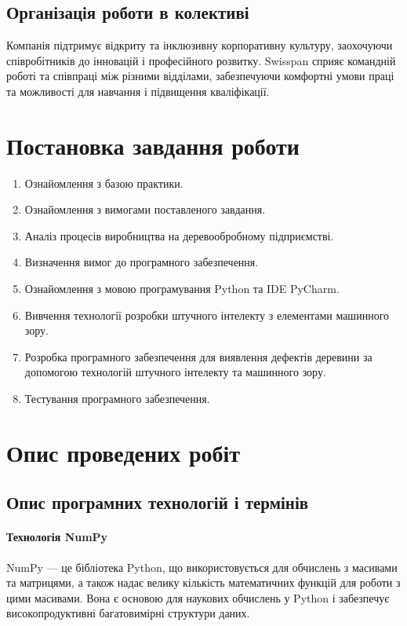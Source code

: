 \documentclass[oneside,14pt]{extarticle}
\begin{document}
\subsection{Організація роботи в колективі}

Компанія підтримує відкриту та інклюзивну корпоративну культуру, заохочуючи співробітників до інновацій і професійного розвитку. Swisspan сприяє командній роботі та співпраці між різними відділами, забезпечуючи комфортні умови праці та можливості для навчання і підвищення кваліфікації.

\section{Постановка завдання роботи}
\begin{enumerate}
	\item Ознайомлення з базою практики.
	\item Ознайомлення з вимогами поставленого завдання.
	\item Аналіз процесів виробництва на деревообробному підприємстві.
	\item Визначення вимог до програмного забезпечення.
	\item Ознайомлення з мовою програмування Python та IDE PyCharm.
	\item Вивчення технології розробки штучного інтелекту з елементами машинного зору.
	\item Розробка програмного забезпечення для виявлення дефектів деревини за допомогою технологій штучного інтелекту та машинного зору.
	\item Тестування програмного забезпечення.
\end{enumerate}

\section{Опис проведених робіт}

\subsection{Опис програмних технологій і термінів}

\paragraph{Технологія NumPy}

NumPy — це бібліотека Python, що використовується для обчислень з масивами та матрицями, а також надає велику кількість математичних функцій для роботи з цими масивами. Вона є основою для наукових обчислень у Python і забезпечує високопродуктивні багатовимірні структури даних.
\end{document}
